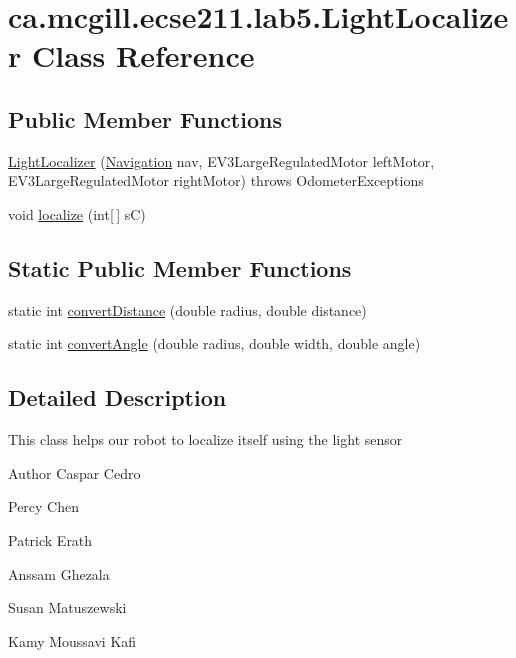 \hypertarget{classca_1_1mcgill_1_1ecse211_1_1lab5_1_1_light_localizer}{}\section{ca.\+mcgill.\+ecse211.\+lab5.\+Light\+Localizer Class Reference}
\label{classca_1_1mcgill_1_1ecse211_1_1lab5_1_1_light_localizer}
\subsection*{Public Member Functions}
\begin{DoxyCompactItemize}
\item 
\hyperlink{classca_1_1mcgill_1_1ecse211_1_1lab5_1_1_light_localizer_a83dbb9eaea19092e27f6f9acdd35d37a}{Light\+Localizer} (\hyperlink{classca_1_1mcgill_1_1ecse211_1_1lab5_1_1_navigation}{Navigation} nav, E\+V3\+Large\+Regulated\+Motor left\+Motor, E\+V3\+Large\+Regulated\+Motor right\+Motor)  throws Odometer\+Exceptions 
\item 
void \hyperlink{classca_1_1mcgill_1_1ecse211_1_1lab5_1_1_light_localizer_a441f56a899fae5bc9c1d6a6d25fbe0bb}{localize} (int\mbox{[}$\,$\mbox{]} sC)
\end{DoxyCompactItemize}
\subsection*{Static Public Member Functions}
\begin{DoxyCompactItemize}
\item 
static int \hyperlink{classca_1_1mcgill_1_1ecse211_1_1lab5_1_1_light_localizer_a9eebe889aa2d4d2e881f413cc727cd9c}{convert\+Distance} (double radius, double distance)
\item 
static int \hyperlink{classca_1_1mcgill_1_1ecse211_1_1lab5_1_1_light_localizer_ab9d7289c4badf692fd5c83635305f2c5}{convert\+Angle} (double radius, double width, double angle)
\end{DoxyCompactItemize}


\subsection{Detailed Description}
This class helps our robot to localize itself using the light sensor

\begin{DoxyAuthor}{Author}
Caspar Cedro 

Percy Chen 

Patrick Erath 

Anssam Ghezala 

Susan Matuszewski 

Kamy Moussavi Kafi 
\end{DoxyAuthor}


